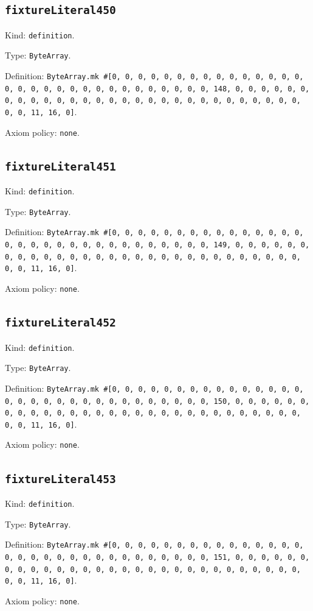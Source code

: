 \documentclass[11pt]{article}
\begin{document}
\subsection*{\texttt{fixtureLiteral450}}
\noindent Kind: \texttt{definition}.\par
\noindent Type: \texttt{ByteArray}.\par
\noindent Definition: \texttt{ByteArray.mk \#[0, 0, 0, 0, 0, 0, 0, 0, 0, 0, 0, 0, 0, 0, 0, 0, 0, 0, 0, 0, 0, 0, 0, 0, 0, 0, 0, 0, 0, 0, 0, 148, 0, 0, 0, 0, 0, 0, 0, 0, 0, 0, 0, 0, 0, 0, 0, 0, 0, 0, 0, 0, 0, 0, 0, 0, 0, 0, 0, 0, 0, 0, 0, 11, 16, 0]}.\par
\noindent Axiom policy: \texttt{none}.\par
\subsection*{\texttt{fixtureLiteral451}}
\noindent Kind: \texttt{definition}.\par
\noindent Type: \texttt{ByteArray}.\par
\noindent Definition: \texttt{ByteArray.mk \#[0, 0, 0, 0, 0, 0, 0, 0, 0, 0, 0, 0, 0, 0, 0, 0, 0, 0, 0, 0, 0, 0, 0, 0, 0, 0, 0, 0, 0, 0, 0, 149, 0, 0, 0, 0, 0, 0, 0, 0, 0, 0, 0, 0, 0, 0, 0, 0, 0, 0, 0, 0, 0, 0, 0, 0, 0, 0, 0, 0, 0, 0, 0, 11, 16, 0]}.\par
\noindent Axiom policy: \texttt{none}.\par
\subsection*{\texttt{fixtureLiteral452}}
\noindent Kind: \texttt{definition}.\par
\noindent Type: \texttt{ByteArray}.\par
\noindent Definition: \texttt{ByteArray.mk \#[0, 0, 0, 0, 0, 0, 0, 0, 0, 0, 0, 0, 0, 0, 0, 0, 0, 0, 0, 0, 0, 0, 0, 0, 0, 0, 0, 0, 0, 0, 0, 150, 0, 0, 0, 0, 0, 0, 0, 0, 0, 0, 0, 0, 0, 0, 0, 0, 0, 0, 0, 0, 0, 0, 0, 0, 0, 0, 0, 0, 0, 0, 0, 11, 16, 0]}.\par
\noindent Axiom policy: \texttt{none}.\par
\subsection*{\texttt{fixtureLiteral453}}
\noindent Kind: \texttt{definition}.\par
\noindent Type: \texttt{ByteArray}.\par
\noindent Definition: \texttt{ByteArray.mk \#[0, 0, 0, 0, 0, 0, 0, 0, 0, 0, 0, 0, 0, 0, 0, 0, 0, 0, 0, 0, 0, 0, 0, 0, 0, 0, 0, 0, 0, 0, 0, 151, 0, 0, 0, 0, 0, 0, 0, 0, 0, 0, 0, 0, 0, 0, 0, 0, 0, 0, 0, 0, 0, 0, 0, 0, 0, 0, 0, 0, 0, 0, 0, 11, 16, 0]}.\par
\noindent Axiom policy: \texttt{none}.\par
\end{document}
